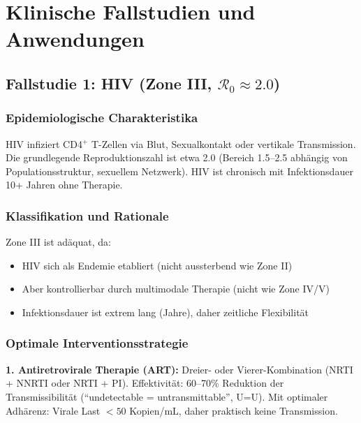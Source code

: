 ﻿\documentclass[a4paper,12pt,twoside]{article}
\theoremstyle{definition}
\begin{document}
\section{Klinische Fallstudien und Anwendungen}
\label{sec:applications}

\subsection{Fallstudie 1: HIV (Zone III, $\mathcal{R}_0 \approx 2.0$)}

\subsubsection{Epidemiologische Charakteristika}

HIV infiziert CD4$^+$ T-Zellen via Blut, Sexualkontakt oder vertikale Transmission. Die grundlegende Reproduktionszahl ist etwa 2.0 (Bereich 1.5--2.5 abhängig von Populationsstruktur, sexuellem Netzwerk). HIV ist chronisch mit Infektionsdauer 10+ Jahren ohne Therapie.

\subsubsection{Klassifikation und Rationale}

Zone III ist adäquat, da:
\begin{itemize}
\item HIV sich als Endemie etabliert (nicht aussterbend wie Zone II)
\item Aber kontrollierbar durch multimodale Therapie (nicht wie Zone IV/V)
\item Infektionsdauer ist extrem lang (Jahre), daher zeitliche Flexibilität
\end{itemize}

\subsubsection{Optimale Interventionsstrategie}

\textbf{1. Antiretrovirale Therapie (ART):} Dreier- oder Vierer-Kombination (NRTI + NNRTI oder NRTI + PI). Effektivität: 60--70\% Reduktion der Transmissibilität (``undetectable = untransmittable'', U=U). Mit optimaler Adhärenz: Virale Last $< 50$ Kopien/mL, daher praktisch keine Transmission.
\end{document}
